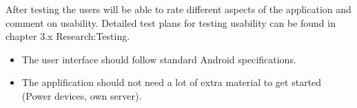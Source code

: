 After testing the users will be able to rate different aspects of the application and comment on usability. Detailed 
test plans for testing usability can be found in chapter 3.x Research:Testing.

\begin{itemize}
\item The user interface should follow standard Android specifications. 
\item The applification should not need a lot of extra material to get started (Power devices, own server).
\end{itemize}


